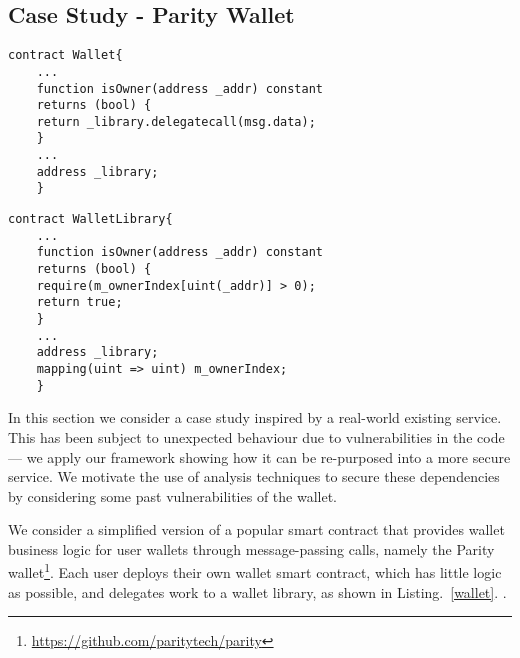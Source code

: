 \subsection{Case Study - Parity Wallet}
\label{}

\noindent\begin{minipage}{.45\textwidth}
	\hfill
	\begin{lstlisting}[caption={Part of Wallet smart contract.},basicstyle=\tiny,captionpos=b,label={wallet}]
	contract Wallet{
	...
	function isOwner(address _addr) constant 
	returns (bool) {
	return _library.delegatecall(msg.data);
	}
	...
	address _library;
	}
	\end{lstlisting}
\end{minipage}\hfill
\begin{minipage}{.45\textwidth}
	\begin{lstlisting}[caption={Part of WalletLibrary smart contract.},basicstyle=\tiny,captionpos=b,label={walletlibrary}]
	contract WalletLibrary{
	...
	function isOwner(address _addr) constant 
	returns (bool) {
	require(m_ownerIndex[uint(_addr)] > 0);
	return true;
	}
	...
	address _library;
	mapping(uint => uint) m_ownerIndex;
	}
	\end{lstlisting}
\end{minipage}

In this section we consider a case study inspired by a real-world existing service. This has been subject to unexpected behaviour due to vulnerabilities in the code --- we apply our framework showing how it can be re-purposed into a more secure service. We motivate the use of analysis techniques to secure these dependencies by considering some past vulnerabilities of the wallet.

We consider a simplified version of a popular smart contract that provides wallet business logic for user wallets through message-passing calls, namely the Parity wallet\footnote{\url{https://github.com/paritytech/parity}}. Each user deploys their own wallet smart contract, which has little logic as possible, and delegates work to a wallet library, as shown in Listing.~\ref{wallet}.
. %

